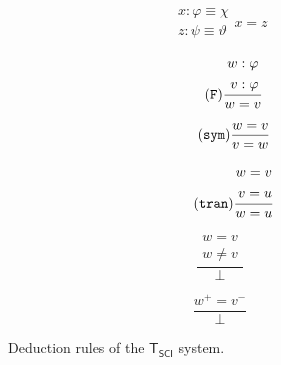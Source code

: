 \documentclass{article}
\theoremstyle{definition}
\theoremstyle{definition}
\theoremstyle{definition}
\newcommand*{\id}{\equiv}
\newcommand{\TSCI}{$\mathsf{T_{SCI}}$\xspace}
\begin{document}
\begin{figure}
\begin{subfigure}{\textwidth}
\begin{subfigure}{0.24\textwidth}
\begin{equation}
{\begin{split}
                        x: \varphi \id \chi \\
                        z: \psi \id \vartheta
                    \end{split}
                }%
                {x = z}
            \end{equation}
        \end{subfigure}
        \begin{subfigure}{0.24\textwidth}
            \begin{equation}
                \tag{\texttt{F}}
                \frac{
                    \begin{split}
                        w: \varphi \\
                        v: \varphi
                    \end{split}
                }%
                {w = v}
            \end{equation}
        \end{subfigure}
        \begin{subfigure}{0.24\textwidth}
            \begin{equation}
                \tag{\texttt{sym}}
                \frac{
                    w=v
                }%
                {v = w}
            \end{equation}
        \end{subfigure}
        \begin{subfigure}{0.24\textwidth}
            \begin{equation}
                \tag{\texttt{tran}}
                \frac{
                \begin{split}
                    w=v\\
                    v=u
                \end{split}
                }%
                {w = u}
            \end{equation}
        \end{subfigure}
        \begin{subfigure}{0.24\textwidth}
            \begin{equation}
                \tag{$\bot_1$}
                \frac{
                \begin{split}
                    w=v\\
                    w \not = v
                \end{split}
                }%
                {\bot}
            \end{equation}
        \end{subfigure}
        \begin{subfigure}{0.24\textwidth}
            \begin{equation}
                \tag{$\bot_2$}
                \frac{
                    w^+ = v^-
                }%
                {\bot}
            \end{equation}
        \end{subfigure}
    \end{subfigure}
    \caption{Deduction rules of the \TSCI system.}
    \label{fig:rules1}
\end{figure}
\end{document}
